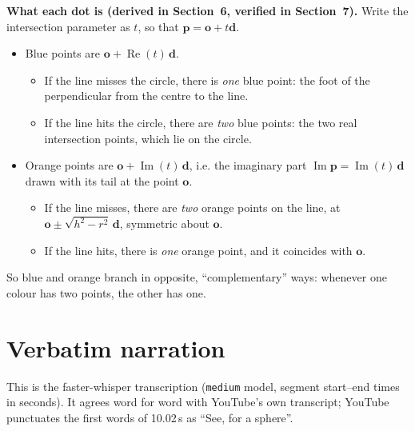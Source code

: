 \documentclass[10pt,a4paper]{article}
\newcommand{\vo}{\mathbf{o}}\newcommand{\vd}{\mathbf{d}}\newcommand{\vp}{\mathbf{p}}
\begin{document}
\textbf{What each dot is (derived in Section~6, verified in Section~7).} Write the intersection parameter as $t$, so that $\vp=\vo+t\vd$.
\begin{itemize}
\item \textcolor{blue!70!cyan}{Blue} points are $\vo+\operatorname{Re}(t)\,\vd$.
  \begin{itemize}
  \item If the line misses the circle, there is \emph{one} blue point: the foot of the perpendicular from the centre to the line.
  \item If the line hits the circle, there are \emph{two} blue points: the two real intersection points, which lie on the circle.
  \end{itemize}
\item \textcolor{orange!90!black}{Orange} points are $\vo+\operatorname{Im}(t)\,\vd$, i.e. the imaginary part $\operatorname{Im}\vp=\operatorname{Im}(t)\,\vd$ drawn with its tail at the point $\vo$.
  \begin{itemize}
  \item If the line misses, there are \emph{two} orange points on the line, at $\vo\pm\sqrt{h^2-r^2}\,\vd$, symmetric about $\vo$.
  \item If the line hits, there is \emph{one} orange point, and it coincides with $\vo$.
  \end{itemize}
\end{itemize}
So blue and orange branch in opposite, ``complementary'' ways: whenever one colour has two points, the other has one.

\section{Verbatim narration}
This is the faster-whisper transcription (\texttt{medium} model, segment start--end times in seconds). It agrees word for word with YouTube's own transcript; YouTube punctuates the first words of 10.02\,s as ``See, for a sphere''.
\end{document}

